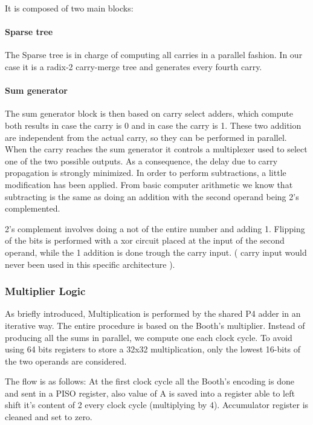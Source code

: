 \documentclass[12pt]{article}
\begin{document}
It is composed of two main blocks: 
\paragraph{Sparse tree}The Sparse tree is in charge of computing all carries in a parallel fashion. In our case it is a radix-2 carry-merge tree and generates every fourth carry. 

\paragraph{Sum generator}The sum generator block is then based on carry select adders, which compute both results in case the carry is 0 and in case the carry is 1. These two addition are independent from the actual carry, so they can be performed in parallel. When the carry reaches the sum generator it controls a multiplexer used to select one of the two possible outputs.
As a consequence, the delay due to carry propagation is strongly minimized.
\newline
\newline
In order to perform subtractions, a little modification has been applied. From basic computer arithmetic we know that subtracting is the same as doing an addition with the second operand being 2's complemented.

2's complement involves doing a not of the entire number and adding 1.
Flipping of the bits is performed with a xor circuit placed at the input of the second operand, while the 1 addition is done trough the carry input. ( carry input would never been used in this specific architecture ). 



\subsubsection{Multiplier Logic}
As briefly introduced, Multiplication is performed by the shared P4 adder in an iterative way.
The entire procedure is based on the Booth's multiplier. Instead of producing all the sums in parallel, we compute one each clock cycle.
To avoid using 64 bits registers to store a 32x32 multiplication, only the lowest 16-bits of the two operands are considered.

The flow is as follows:
At the first clock cycle all the Booth's encoding is done and sent in a PISO register, also value of A is saved into a register able to left shift it's content of 2 every clock cycle (multiplying by 4). Accumulator register is cleaned and set to zero.
\end{document}
